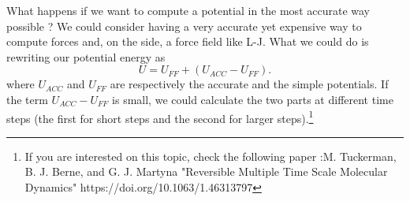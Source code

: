 What happens if we want to compute a potential in the most accurate way possible ? We could consider having a very accurate yet expensive way to compute forces and, on the side, a force field like L-J. What we could do is rewriting our potential energy as
\begin{equation}
    U = U_{FF} + (U_{ACC} - U_{FF}).
\end{equation}
where $U_{ACC}$ and $U_{FF}$ are respectively the accurate and the simple potentials.
If the term $U_{ACC} - U_{FF}$ is small, we could calculate the two parts at different time steps (the first for short steps and the second for larger steps).\footnote{If you are interested on this topic, check the following paper :M. Tuckerman, B. J. Berne, and G. J. Martyna "Reversible Multiple Time Scale Molecular Dynamics" https://doi.org/10.1063/1.46313797}